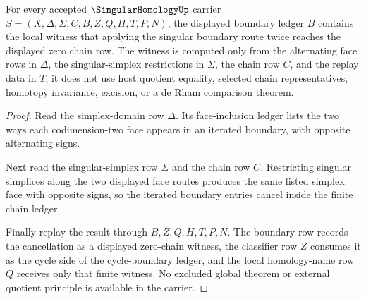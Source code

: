 \begin{theorem}\label{thm:singular-homology-boundary-square-zero}
For every accepted $\SingularHomologyUp$ carrier $S=(X,\Delta,\Sigma,C,B,Z,Q,H,T,P,N)$, the displayed boundary ledger $B$ contains the local witness that applying the singular boundary route twice reaches the displayed zero chain row. The witness is computed only from the alternating face rows in $\Delta$, the singular-simplex restrictions in $\Sigma$, the chain row $C$, and the replay data in $T$; it does not use host quotient equality, selected chain representatives, homotopy invariance, excision, or a de Rham comparison theorem.
\end{theorem}
\begin{proof}
Read the simplex-domain row $\Delta$. Its face-inclusion ledger lists the two ways each codimension-two face appears in an iterated boundary, with opposite alternating signs.

Next read the singular-simplex row $\Sigma$ and the chain row $C$. Restricting singular simplices along the two displayed face routes produces the same listed simplex face with opposite signs, so the iterated boundary entries cancel inside the finite chain ledger.

Finally replay the result through $B,Z,Q,H,T,P,N$. The boundary row records the cancellation as a displayed zero-chain witness, the classifier row $Z$ consumes it as the cycle side of the cycle-boundary ledger, and the local homology-name row $Q$ receives only that finite witness. No excluded global theorem or external quotient principle is available in the carrier.
\end{proof}

\begin{closurestatus}{\SingularHomologyUp}
  \theoryclosure{\seedClosure}
  \formalstatus{\unformalizedV}
\end{closurestatus}
